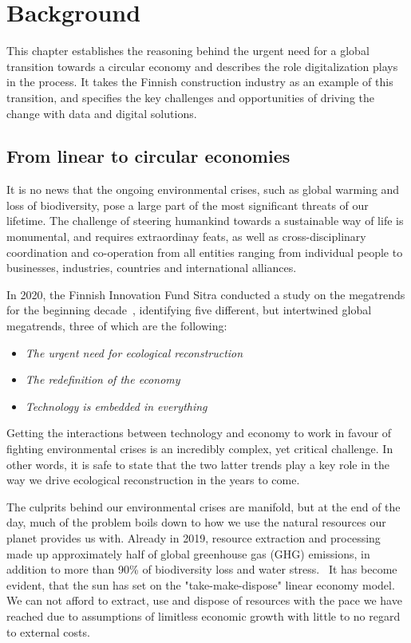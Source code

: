 \documentclass[english, 12pt, a4paper, sci, utf8, a-2b, online]{aaltothesis}
\begin{document}
\clearpage

\section{Background} \label{background}

This chapter establishes the reasoning behind the urgent need for a global transition towards a circular economy and describes the role digitalization plays in the process.
It takes the Finnish construction industry as an example of this transition, and specifies the key challenges and opportunities of driving the change with data and digital solutions.

\subsection{From linear to circular economies} \label{ce}

It is no news that the ongoing environmental crises, such as global warming and loss of biodiversity, pose a large part of the most
significant threats of our lifetime. The challenge of steering humankind towards a sustainable way of life is monumental, and requires
extraordinay feats, as well as cross-disciplinary coordination and co-operation from all entities ranging from individual people to
businesses, industries, countries and international alliances.

In 2020, the Finnish Innovation Fund Sitra conducted a study on the megatrends for the beginning decade~\cite{dufva}, identifying
five different, but intertwined global megatrends, three of which are the following:
\begin{itemize}
  \item \textit{The urgent need for ecological reconstruction}
  \item \textit{The redefinition of the economy}
  \item \textit{Technology is embedded in everything}
\end{itemize}
Getting the interactions between technology and economy to work in favour of fighting environmental crises is an incredibly complex, yet critical
challenge. In other words, it is safe to state that the two latter trends play a key role in the way we drive ecological reconstruction in the years to come.

The culprits behind our environmental crises are manifold, but at the end of the day, much of the problem boils
down to how we use the natural resources our planet provides us with. Already in 2019,
resource extraction and processing made up approximately half of global greenhouse gas (GHG) emissions, in addition to more than 90\% of
biodiversity loss and water stress.~\cite{oberle} It has become evident, that the sun has set on the "take-make-dispose" linear economy model. We
can not afford to extract, use and dispose of resources with the pace we have reached due to assumptions of limitless economic growth
with little to no regard to external costs.
\end{document}
